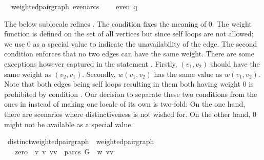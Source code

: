 \begin{isabellebody}
%
\endisadelimproof
%
\isatagproof
%
\endisatagproof
{\isafoldproof}%
%
\isadelimproof
%
\endisadelimproof
%
\begin{isamarkuptext}%
%
\end{isamarkuptext}\isamarkuptrue%
\isamarkupfalse%
\ {\isacharparenleft}\ weighted{\isacharunderscore}pair{\isacharunderscore}graph{\isacharparenright}\ even{\isacharunderscore}arcs{\isacharcolon}\ \isanewline
\ \ \ {\isachardoublequoteopen}even\ q{\isachardoublequoteclose}%
\isadelimproof
%
\endisadelimproof
%
\isatagproof
%
\endisatagproof
{\isafoldproof}%
%
\isadelimproof
%
\endisadelimproof
%
\begin{isamarkuptext}%
The below sublocale  refines
. The condition 
 fixes the meaning of 0.
The weight function is defined on the set of all vertices but since self loops are not allowed; 
we use 0 as a special value to indicate the unavailability of the edge. 
The second condition  enforces that no two edges can have the same weight. There
are some exceptions however captured in the statement .
Firstly, $(v_1,v_2)$ should have the same weight as $(v_2,v_1)$. Secondly, $w(v_1,v_2)$ has the
same value as $w(v_1,v_2)$. Note that both edges being self loops resulting in them both having 
weight 0 is prohibited by condition .
Our decision to separate these two conditions from the ones in 
instead of making one locale of its own is two-fold: On the one hand, there are scenarios where 
distinctiveness is not wished for. On the other hand, 0 might not be available as a special value.%
\end{isamarkuptext}\isamarkuptrue%
\isamarkupfalse%
\ distinct{\isacharunderscore}weighted{\isacharunderscore}pair{\isacharunderscore}graph\ {\isacharequal}\ weighted{\isacharunderscore}pair{\isacharunderscore}graph\ {\isacharplus}\ \isanewline
\ \ \ zero{\isacharcolon}\ {\isachardoublequoteopen}{\isasymforall}\ v\ v\ {\isacharparenleft}vv\ {\isasymnotin}\ parcs\ G\ {\isasymlongleftrightarrow}\ w\ {\isacharparenleft}vv\ {\isacharequal}\ {}{\isachardoublequoteclose}\isanewline

\end{isabellebody}
